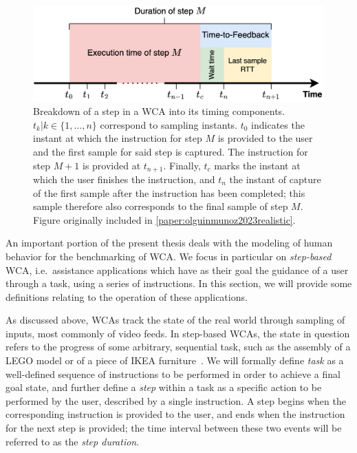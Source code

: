 \begin{figure}
    \centering
    \includegraphics[width=.9\textwidth]{publications/2023EdgeDroid2/figs/step_time}
    \caption[]{%
        Breakdown of a step in a \gls{WCA} into its timing components.
        \ensuremath{t_k | k \in \{1, \ldots, n \}} correspond to sampling instants.
        \ensuremath{t_0} indicates the instant at which the instruction for step \ensuremath{M} is provided to the user and the first sample for said step is captured.
        The instruction for step \ensuremath{M + 1} is provided at \ensuremath{t_{n+1}}.
        Finally, \ensuremath{t_c} marks the instant at which the user finishes the instruction, and \ensuremath{t_n} the instant of capture of the first sample after the instruction has been completed;
        this sample therefore also corresponds to the final sample of step \ensuremath{M}.
        Figure originally included in \cref{paper:olguinmunoz2023realistic}.
    }\label{fig:wcastep}
\end{figure}

An important portion of the present thesis deals with the modeling of human behavior for the benchmarking of \gls{WCA}.
We focus in particular on \emph{step-based} \gls{WCA}, i.e.\ assistance applications which have as their goal the guidance of a user through a task, using a series of instructions.
In this section, we will provide some definitions relating to the operation of these applications.

As discussed above, \glspl{WCA} track the state of the real world through sampling of inputs, most commonly of video feeds.
In step-based \glspl{WCA}, the state in question refers to the progress of some arbitrary, sequential task, such as the assembly of a LEGO model or of a piece of IKEA furniture~\cite{chen2018application}.
We will formally define \emph{task} as a well-defined sequence of instructions to be performed in order to achieve a final goal state, and further define a \emph{step} within a task as a specific action to be performed by the user, described by a single instruction.
A step begins when the corresponding instruction is provided to the user, and ends when the instruction for the next step is provided;
the time interval between these two events will be referred to as the \emph{step duration}.

